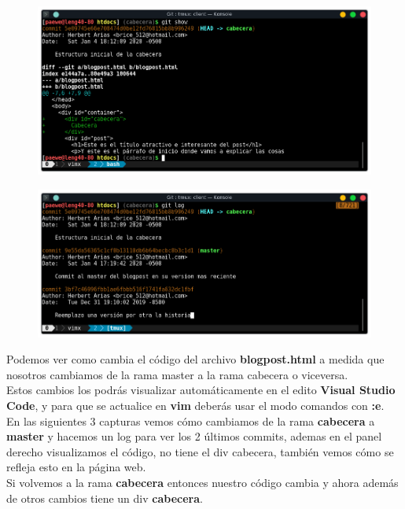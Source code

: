 \documentclass{article}
\begin{document}
\begin{figure}[h!]
  \centering
  \includegraphics[scale=0.75]{./Pictures/141_show.png}
\end{figure}

\begin{figure}[h!]
  \centering
  \includegraphics[scale=0.75]{./Pictures/142_git_log.png}
\end{figure}

Podemos ver como cambia el código del archivo \textbf{blogpost.html} a medida
que nosotros cambiamos de la rama master a la rama cabecera o viceversa.\\

Estos cambios los podrás visualizar automáticamente en el edito \textbf{Visual
Studio Code}, y para que se actualice en \textbf{vim} deberás usar el modo
comandos con \textbf{:e}.\\

En las siguientes 3 capturas vemos cómo cambiamos de la rama
\textbf{cabecera} a \textbf{master} y hacemos un log para ver los 2 últimos
commits, ademas en el panel derecho visualizamos el código, no tiene el div
cabecera, también vemos cómo se refleja esto en la página web.\\

Si volvemos a la rama \textbf{cabecera} entonces nuestro código cambia y ahora
además de otros cambios tiene un div \textbf{cabecera}.
\end{document}
